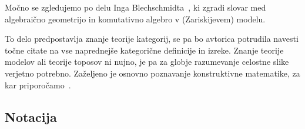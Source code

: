 


Močno se zgledujemo po delu Inga Blechschmidta~\cite{Blechschmidt17}, ki zgradi
slovar med algebraično geometrijo in komutativno algebro v (Zariskijevem)
modelu.

To delo predpostavlja znanje teorije kategorij, se pa bo avtorica potrudila
navesti točne citate na vse naprednejše kategorične definicije in izreke. Znanje
teorije modelov ali teorije toposov ni nujno, je pa za globje razumevanje
celostne slike verjetno potrebno. Zaželjeno je osnovno poznavanje konstruktivne
matematike, za kar priporočamo~\cite{Bauer16, Greenleaf20, Bishop85}.

\subsection{Notacija}

